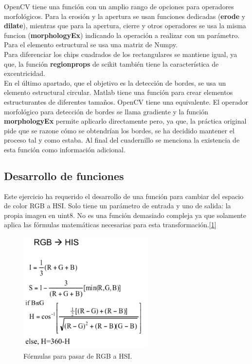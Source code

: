 \documentclass[a4paper,12pt]{report}
\begin{document}
OpenCV tiene una función con un amplio rango de opciones para operadores morfológicos.  Para la erosión y la apertura se usan funciones dedicadas (\textbf{erode} y \textbf{dilate}), mientras que para la apertura, cierre y otros operadores se usa la misma funcion (\textbf{morphologyEx}) indicando la operación a realizar con un parámetro. Para el elemento estructural se usa una matriz de Numpy.\\

Para diferenciar los chips cuadrados de los rectangulares se mantiene igual, ya que, la función \textbf{regionprops} de scikit también tiene la característica de excentricidad.\\

En el último apartado, que el objetivo es la detección de bordes, se usa un elemento estructural circular. Matlab  tiene una función para crear elementos  estructurantes de diferentes tamaños. OpenCV tiene una equivalente. El operador morfológico para detección de bordes se llama gradiente y la función \textbf{morphologyEx} permite aplicarlo directamente pero, ya que, la práctica original pide que se razone cómo se obtendrían los bordes, se ha decidido mantener el proceso tal y como estaba. Al final del cuadernillo se menciona la existencia de esta función como información adicional.

\subsection{Desarrollo de funciones}

Este ejercicio ha requerido el desarrollo de una función para cambiar del espacio de color RGB a HSI. Solo tiene un parámetro de entrada y uno de salida: la propia imagen en uint8. No es una función demasiado compleja ya que solamente aplica las fórmulas matemáticas necesarias para esta transformación.[\ref{rgb2hsi}]

\begin{figure}[h]
\centering
\includegraphics[width=0.6\textwidth]{imagenes/rgb2hsi}
\caption{Fórmulas para pasar de RGB a HSI.}
\label{rgb2hsi} 
\end{figure}
\end{document}
